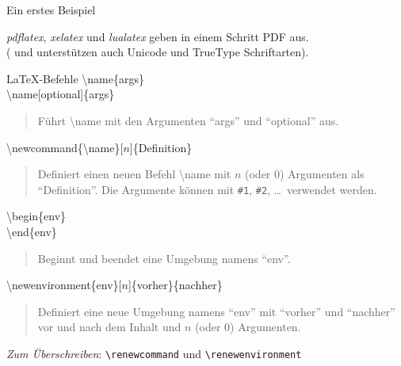 \documentclass[aspectratio=169]{beamer}
\newenvironment{Shaded}{\begin{snugshade}}{\end{snugshade}}
\newcommand{\NormalTok}[1]{\textcolor[rgb]{0.19,0.19,0.19}{#1}}
\newenvironment{Shaded}{}{}
\newcommand\citestyle[1]{\textcolor{foreground-secondary}{\textsuperscript{#1}}}
\let\oldcite=\cite
\renewcommand{\cite}[1]{\citestyle{\oldcite{#1}}}
\let\oldautocite\autocite
\renewcommand{\autocite}[1]{\citestyle{\oldautocite{#1}}}
\begin{document}
\begin{frame}[fragile]{Ein erstes Beispiel}
\begin{Shaded}
\end{Shaded}

    \emph{pdflatex}\autocite{ctan-pdftex},
    \emph{xelatex}\autocite{ctan-xetex} und
    \emph{lualatex}\autocite{ctan-luatex} geben in einem Schritt PDF
    aus.\\
    ( und  unterstützen auch Unicode und
    TrueType Schriftarten).
    \end{frame}

    \begin{frame}[fragile]{\LaTeX-Befehle}
    \protect\hypertarget{befehle}{}
    \bgroup 
        \alert{\ttfamily \textbackslash name\{args\} \\ \textbackslash name[optional]\{args\}}
        \begin{quote}\upshape

        Führt \textbackslash name mit den Argumenten \enquote{\ttfamily args} und \enquote{\ttfamily optional} aus.\cite{latex}

        \end{quote}
    \egroup

    \bgroup 
        \alert{\ttfamily \textbackslash newcommand\{\textbackslash name\}[$n$]\{Definition\}}
        \begin{quote}\upshape

        Definiert einen neuen Befehl \textbackslash name mit $n$ (oder 0) Argumenten als \enquote{\ttfamily Definition}.
        Die Argumente können mit \texttt{\#1}, \texttt{\#2}, \ldots\ verwendet werden.\cite{latex}

        \end{quote}
    \egroup

    \bgroup 
        \alert{\ttfamily \textbackslash begin\{env\} \\ \textbackslash end\{env\}}
        \begin{quote}\upshape

        Beginnt und beendet eine Umgebung namens \enquote{\ttfamily env}.\cite{latex}

        \end{quote}
    \egroup

    \bgroup 
        \alert{\ttfamily \textbackslash newenvironment\{env\}[$n$]\{vorher\}\{nachher\}}
        \begin{quote}\upshape

        Definiert eine neue Umgebung namens \enquote{\ttfamily env} mit \enquote{\ttfamily vorher} und \enquote{\ttfamily nachher} vor und nach dem Inhalt und $n$ (oder 0) Argumenten.\cite{latex}

        \end{quote}
    \egroup

    \emph{Zum Überschreiben}: \texttt{\textbackslash{}renewcommand} und
    \texttt{\textbackslash{}renewenvironment}\autocite{latex}
    \end{frame}
\end{document}
